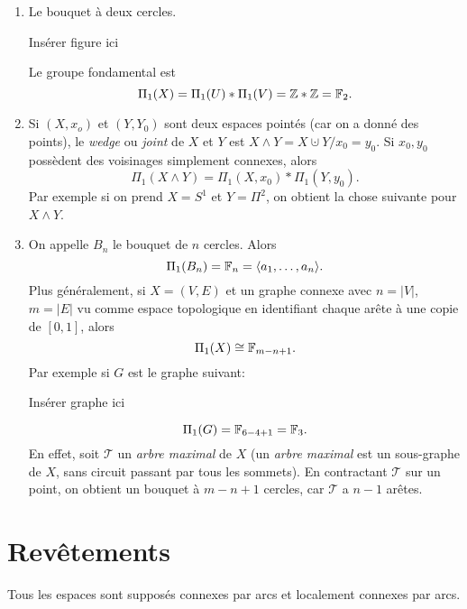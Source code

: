   \begin{exs}  
    \begin{enumerate}
    \item Le bouquet à deux cercles.
      \begin{center}
        Insérer figure ici
      \end{center}
      Le groupe fondamental est
        \[\Pi_1(X) = \Pi_1(U) \ast \Pi_1(V) = \mathbb{Z} \ast \mathbb{Z} = \mathbb{F}_2.\]

      \item Si $(X, x_o)$ et $(Y, Y_0)$ sont deux espaces pointés (car on a donné des points), le
        \emph{wedge} ou \emph{joint} de $X$ et $Y$ est $X \wedge Y = X \cupdot Y / x_0=y_0$. Si $x_0, y_0$
        possèdent des voisinages simplement connexes, alors
          \[\Pi_1(X \wedge Y) = \Pi_1(X, x_0) \ast \Pi_1(Y, y_0).\]
        Par exemple si on prend $X = S^1$ et $Y = \Pi^2$, on obtient la chose suivante pour $X \wedge Y$.

      \item On appelle $B_n$ le bouquet de $n$ cercles. Alors
          \[\Pi_1(B_n) = \mathbb{F}_n = \langle a_1, \ldots, a_n\rangle. \]
        Plus généralement, si $X = (V,E)$ et un graphe connexe avec $n = |V|$, $m = |E|$ vu comme espace
        topologique en identifiant chaque arête à une copie de $[0,1]$, alors
          \[\Pi_1(X) \cong \mathbb{F}_{m-n+1}.\]
        Par exemple si $G$ est le graphe suivant:
        \begin{center}
          Insérer graphe ici
        \end{center}
          \[\Pi_1(G) = \mathbb{F}_{6-4+1} = \mathbb{F}_3.\]
        En effet, soit $\mathcal{T}$ un \emph{arbre maximal}  de $X$ (un \emph{arbre
          maximal} est un sous-graphe de $X$, sans circuit passant par tous les sommets). En contractant
        $\mathcal{T}$ sur un point, on obtient un bouquet à $m-n+1$ cercles, car $\mathcal{T}$ a $n-1$ arêtes.
    \end{enumerate}
  \end{exs}




  \section{Revêtements}
  \label{sec:revetements}


  Tous les espaces sont supposés connexes par arcs et localement connexes par arcs.

